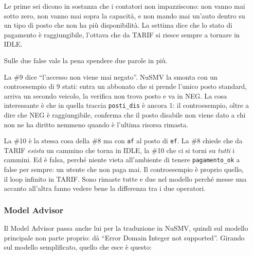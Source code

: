Le prime sei dicono in sostanza che i contatori non impazziscono: non vanno mai sotto
zero, non vanno mai sopra la capacità, e non mando mai un'auto dentro su un tipo di posto
che non ha più disponibilità. La settima dice che lo stato di pagamento è raggiungibile,
l'ottava che da TARIF si riesce sempre a tornare in IDLE.

Sulle due false vale la pena spendere due parole in più.

La \#9 dice ``l'accesso non viene mai negato''. NuSMV la smonta con un controesempio di 9
stati: entra un abbonato che si prende l'unico posto standard, arriva un secondo veicolo,
la verifica non trova posto e va in NEG. La cosa interessante è che in quella traccia
\texttt{posti\_dis} è ancora 1: il controesempio, oltre a dire che NEG è raggiungibile,
conferma che il posto disabile non viene dato a chi non ne ha diritto nemmeno quando è
l'ultima risorsa rimasta.

La \#10 è la stessa cosa della \#8 ma con \texttt{af} al posto di \texttt{ef}. La \#8
chiede che da TARIF \emph{esista} un cammino che torna in IDLE, la \#10 che ci si torni su
\emph{tutti} i cammini. Ed è falsa, perché niente vieta all'ambiente di tenere
\texttt{pagamento\_ok} a false per sempre: un utente che non paga mai. Il controesempio è
proprio quello, il loop infinito in TARIF. Sono rimaste tutte e due nel modello perché
messe una accanto all'altra fanno vedere bene la differenza tra i due operatori.


\newpage
\subsubsection{Model Advisor}\label{sec:model-advisor}

Il Model Advisor passa anche lui per la traduzione in NuSMV, quindi sul modello
principale non parte proprio: dà ``Error Domain Integer not supported''. Girando sul
modello semplificato, quello che esce è questo:

